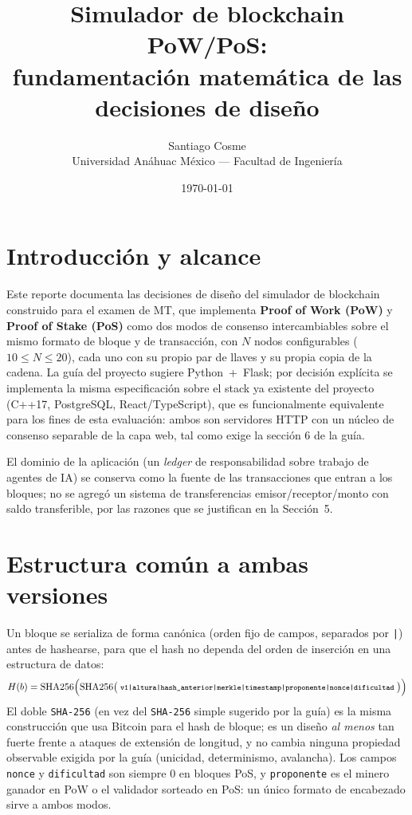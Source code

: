 \documentclass[11pt]{article}
\title{\vspace{-1.2em}Simulador de blockchain PoW/PoS: \\[2pt]\large fundamentación matemática de las decisiones de diseño}
\author{Santiago Cosme \\ \small Universidad Anáhuac México --- Facultad de Ingeniería}
\date{\small \today}
\theoremstyle{remark}
\begin{document}
\maketitle
\vspace{-1.8em}

\section{Introducción y alcance}
Este reporte documenta las decisiones de diseño del simulador de blockchain construido para el examen de MT, que implementa
\textbf{Proof of Work (PoW)} y \textbf{Proof of Stake (PoS)} como dos modos de consenso intercambiables sobre el mismo
formato de bloque y de transacción, con $N$ nodos configurables ($10\le N\le 20$), cada uno con su propio par de llaves y su
propia copia de la cadena. La guía del proyecto sugiere Python~+~Flask; por decisión explícita se implementa la misma
especificación sobre el stack ya existente del proyecto (C++17, PostgreSQL, React/TypeScript), que es funcionalmente
equivalente para los fines de esta evaluación: ambos son servidores HTTP con un núcleo de consenso separable de la capa web,
tal como exige la sección 6 de la guía.

El dominio de la aplicación (un \emph{ledger} de responsabilidad sobre trabajo de agentes de IA) se conserva como la fuente
de las transacciones que entran a los bloques; no se agregó un sistema de transferencias emisor/receptor/monto con saldo
transferible, por las razones que se justifican en la Sección~5.

\section{Estructura común a ambas versiones}
Un bloque se serializa de forma canónica (orden fijo de campos, separados por \texttt{|}) antes de hashearse, para que el
hash no dependa del orden de inserción en una estructura de datos:
\[
H(b) = \mathrm{SHA256}\Big(\mathrm{SHA256}\big(\;\text{\footnotesize\texttt{v1|altura|hash\_anterior|merkle|timestamp|proponente|nonce|dificultad}}\;\big)\Big)
\]
El doble \texttt{SHA-256} (en vez del \texttt{SHA-256} simple sugerido por la guía) es la misma construcción que usa Bitcoin
para el hash de bloque; es un diseño \emph{al menos} tan fuerte frente a ataques de extensión de longitud, y no cambia
ninguna propiedad observable exigida por la guía (unicidad, determinismo, avalancha). Los campos \texttt{nonce} y
\texttt{dificultad} son siempre $0$ en bloques PoS, y \texttt{proponente} es el minero ganador en PoW o el validador
sorteado en PoS: un único formato de encabezado sirve a ambos modos.
\end{document}
